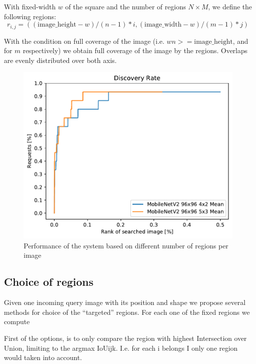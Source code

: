With fixed-width $w$ of the square and the number of regions $N \times M$, we define the following regions:
\[ 
r_{i,j} = {(( \text{image\_height} - w) / (n - 1) *i, ( \text{image\_width} - w) / (m - 1) * j)}
\]

With the condition on full coverage of the image (i.e. \(w n >= \text{image\_height}\), and for $m$ respectively) we obtain full coverage of the image by the regions. Overlaps are evenly distributed over both axis.

\begin{figure}
\centering
\includegraphics[width=\textwidth]{graphs/78f2a977489ac08dddac6f53446b388292306ec95f9dcbc7ca8359fbedfed9b0}
\caption{Performance of the system based on different number of regions per image}
\label{fig:different_number_regions}
\end{figure}

\subsection{Choice of regions}

Given one incoming query image with its position and shape we propose several methods for choice of the “targeted” regions. For each one of the fixed regions we compute %

First of the options, is to only compare the region with highest Intersection over Union, limiting to the argmax IoUijk. I.e. for each i belongs I only one region would taken into account.


